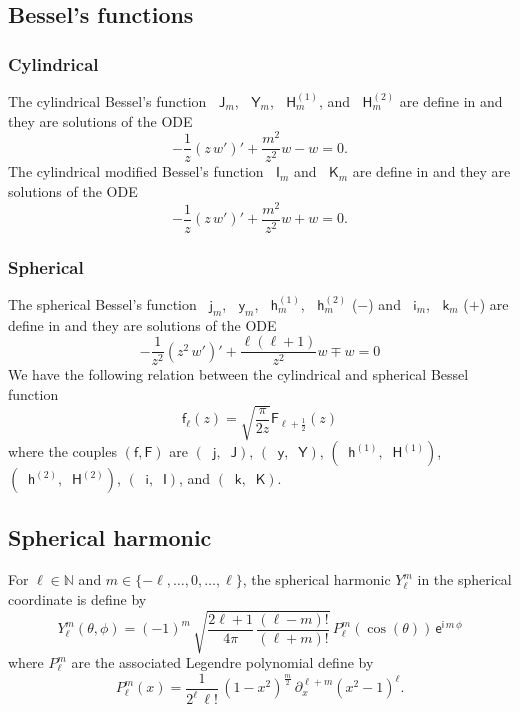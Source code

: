 \documentclass[12pt,a4paper]{article}
\newcommand{\bbN}{\mathbb{N}}
\newcommand{\ex}{\mathsf{e}}
\newcommand{\im}{\mathsf{i}}
\newcommand{\bJ}{\mathop{}\!\mathsf{J}}
\newcommand{\bY}{\mathop{}\!\mathsf{Y}}
\newcommand{\Hu}{\mathop{}\!\mathsf{H}^{(1)}}
\newcommand{\Hd}{\mathop{}\!\mathsf{H}^{(2)}}
\newcommand{\bI}{\mathop{}\!\mathsf{I}}
\newcommand{\bK}{\mathop{}\!\mathsf{K}}
\newcommand{\bj}{\mathop{}\!\mathsf{j}}
\newcommand{\by}{\mathop{}\!\mathsf{y}}
\newcommand{\hu}{\mathop{}\!\mathsf{h}^{(1)}}
\newcommand{\hd}{\mathop{}\!\mathsf{h}^{(2)}}
\newcommand{\bi}{\mathop{}\!\mathsf{i}}
\newcommand{\bk}{\mathop{}\!\mathsf{k}}
\newcommand{\plr}[1]{\left(#1\right)}
\begin{document}
\subsection{Bessel's functions}

%
\subsubsection{Cylindrical}
%

The cylindrical Bessel's function $\bJ_m$, $\bY_m$, $\Hu_m$, and $\Hd_m$ are define in \cite[Sec.~10.2]{NIST:DLMF} and they are solutions of the ODE
\[
    -\frac{1}{z}\plr{z\, w'}' + \frac{m^2}{z^2}w - w = 0.
\]
The cylindrical modified Bessel's function $\bI_m$ and $\bK_m$ are define in \cite[Sec.~10.25]{NIST:DLMF} and they are solutions of the ODE
\[
    -\frac{1}{z}\plr{z\, w'}' + \frac{m^2}{z^2}w + w = 0.
\]

%
\subsubsection{Spherical}
%

The spherical Bessel's function $\bj_m$, $\by_m$, $\hu_m$, $\hd_m$ ($-$) and $\bi_m$, $\bk_m$ ($+$) are define in \cite[Sec.~10.47]{NIST:DLMF} and they are solutions of the ODE
\[
    -\frac{1}{z^2}\plr{z^2\, w'}' + \frac{\ell(\ell+1)}{z^2}w \mp w = 0
\]
We have the following relation between the cylindrical and spherical Bessel function
\[
    \mathsf{f}_\ell(z) = \sqrt{\frac{\pi}{2z}} \mathsf{F}_{\ell+\frac{1}{2}}(z)
\]
where the couples $(\mathsf{f}, \mathsf{F})$ are $(\bj, \bJ)$, $(\by, \bY)$, $(\hu, \Hu)$, $(\hd, \Hd)$, $(\bi, \bI)$, and $(\bk, \bK)$.

\subsection{Spherical harmonic}

For $\ell \in \bbN$ and $m \in \{-\ell, \ldots, 0, \ldots, \ell\}$, the spherical harmonic $Y_\ell^m$ in the spherical coordinate is define by
\[
    Y_\ell^m(\theta, \phi) = (-1)^m\, \sqrt{\frac{2\ell+1}{4\pi}\, \frac{(\ell-m)!}{(\ell+m)!}}\, P_\ell^m(\cos(\theta))\, \ex^{\im\, m\, \phi}
\]
where $P_\ell^m$ are the associated Legendre polynomial define by
\[
    P_\ell^m(x) = \frac{1}{2^\ell\, \ell!}\, (1-x^2)^{\frac{m}{2}}\, \partial_x^{\ell+m} (x^2-1)^\ell.
\]
\end{document}
